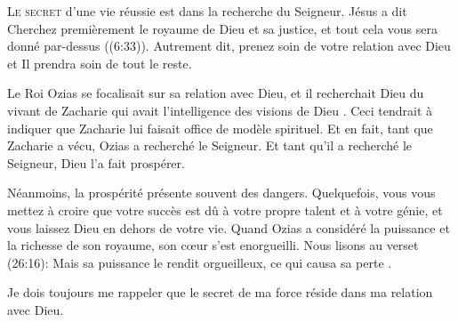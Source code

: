 \jrnlmonth




\lettrine{L}{e secret} d'une vie réussie est dans la recherche du Seigneur.
 Jésus a dit \Og Cherchez premièrement le royaume de Dieu et sa justice,
 et tout cela vous sera donné par-dessus \Fg{} ((6:33)).
 Autrement dit, prenez soin de votre relation avec Dieu et Il prendra soin
 de tout le reste. 

Le Roi Ozias se focalisait sur sa relation avec Dieu,
 et \Og il recherchait Dieu du vivant de Zacharie qui avait l'intelligence
 des visions de Dieu \Fg.
 Ceci tendrait à indiquer que Zacharie lui faisait office de modèle spirituel.
 Et en fait, tant que Zacharie a vécu, Ozias a recherché le Seigneur.
 Et tant qu'il a recherché le Seigneur, Dieu l'a fait prospérer.


Néanmoins, la prospérité présente souvent des dangers.
 Quelquefois, vous vous mettez à croire que votre succès est dû à votre propre
 talent et à votre génie, et vous laissez Dieu en dehors de votre vie.
 Quand Ozias a considéré la puissance et la richesse de son royaume,
 son c\oe{}ur s'est enorgueilli.
 Nous lisons au verset (26:16):
 \Og Mais sa puissance le rendit orgueilleux,
 ce qui causa sa perte \Fg{} \BFC.

Je dois toujours me rappeler que le secret de ma force réside
 dans ma relation avec Dieu. 

\dvrule







